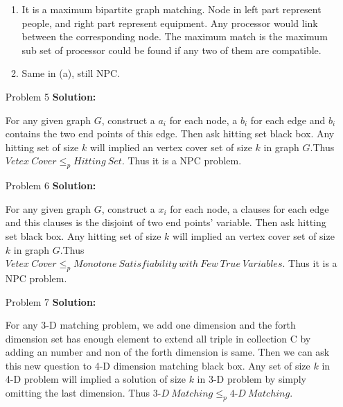 \normalfont\documentclass[letterpaper,11pt]{article}
\begin{document}
\begin{enumerate}
\begin{enumerate}
		\item It is a maximum bipartite graph matching. Node in left part represent people, and right part represent equipment. Any processor would link between the corresponding node. The maximum match is the maximum sub set of processor could be found if any two of them are compatible.
		\item Same in (a), still NPC.
	\end{enumerate}
\item [Problem 5]\textbf{Solution:}\par
	For any given graph $G$, construct a $a_i$ for each node, a $b_i$ for each edge and $b_i$ contains the two end points of this edge. Then ask hitting set black box. Any hitting set of size $k$ will implied an vertex cover set of size $k$ in graph $G$.Thus$Vetex\ Cover \le_p Hitting\ Set$. Thus it is a NPC problem.
\item [Problem 6]\textbf{Solution:}\par
	For any given graph $G$, construct a $x_i$ for each node, a clauses for each edge and this clauses is the disjoint of two end points' variable. Then ask hitting set black box. Any hitting set of size $k$ will implied an vertex cover set of size $k$ in graph $G$.Thus$Vetex\ Cover \le_p Monotone\ Satisfiability\ with\ Few\ True\ Variables$. Thus it is a NPC problem.
\item [Problem 7]\textbf{Solution:}\par
	For any 3-D matching problem, we add one dimension and the forth dimension set has enough element to extend all triple in collection C by adding an number and non of the forth dimension is same. Then we can ask this new question to 4-D dimension matching black box. Any set of size $k$ in 4-D problem will implied a solution of size $k$ in 3-D problem by simply omitting the last dimension. Thus $3\text{-}D\ Matching \le_p 4\text{-}D\ Matching $.
\end{enumerate}
\end{document}
